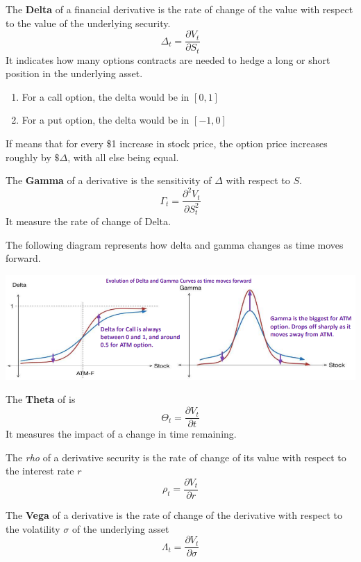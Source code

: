 \documentclass{article}
\begin{document}
\begin{definition}[Delta]
The \textbf{Delta} of a financial derivative is the rate of change of the value with respect to the value of the underlying security.
\[\Delta_t = \frac{\partial V_t}{\partial S_t}\]
It indicates how many options contracts are needed to hedge a long or short position in the underlying asset. 
\begin{enumerate}
    \item For a call option, the delta would be in $[0, 1]$
    \item For a put option, the delta would be in $[-1, 0]$
\end{enumerate}
If means that for every \$1 increase in stock price, the option price increases roughly by $\$\Delta$, with all else being equal.  
\end{definition}

\begin{definition}[Gamma]
The \textbf{Gamma} of a derivative is the sensitivity of $\Delta$ with respect to $S$. 
\[\Gamma_t = \frac{\partial^2 V_t}{\partial S_t^2}\]
It measure the rate of change of Delta. 
\end{definition}

The following diagram represents how delta and gamma changes as time moves forward. 
\begin{center}
    \includegraphics[scale=0.4]{img/delta_gamma_as_time_increases.png}
\end{center}

\begin{definition}[Theta]
The \textbf{Theta} of is 
\[\Theta_t = \frac{\partial V_t}{\partial t}\]
It measures the impact of a change in time remaining. 
\end{definition}

\begin{definition}[rho]
The \textit{rho} of a derivative security is the rate of change of its value with respect to the interest rate $r$
\[\rho_t = \frac{\partial V_t}{\partial r}\]
\end{definition}

\begin{definition}[Vega]
The \textbf{Vega} of a derivative is the rate of change of the derivative with respect to the volatility $\sigma$ of the underlying asset 
\[\Lambda_t = \frac{\partial V_t}{\partial \sigma}\]
\end{definition}
\end{document}
